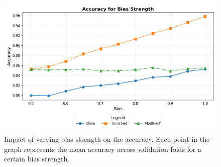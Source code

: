\begin{figure}[h!]
    \centering
    \includegraphics[width=\imagewidth]{gfx/ablation_bias_accuracy.png}
    \caption{Impact of varying bias strength on the accuracy.
    Each point in the graph represents the mean accuracy across validation folds for a certain bias strength.}
    \label{fig:ablation_bias_accuracy}
\end{figure}

